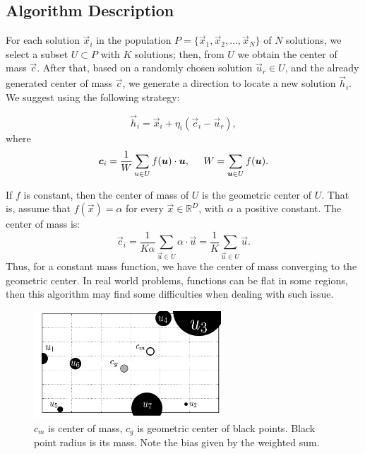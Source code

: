 \documentclass{svproc}
\begin{document}
\subsection{Algorithm Description} %
\label{sub:algorithm_description}

For each solution $\vec{x}_i $ in the population $P = \{ \vec{x}_1, \vec{x}_2, \ldots, \vec{x}_{N} \} $ of $N$ 
solutions, we select a subset $U \subset P $ with $K$ solutions; then, 
from $U$ we obtain the center of mass $\vec{c}$. After that, based on 
a randomly chosen solution $\vec{u}_r \in U$,  
and the already generated center of mass $\vec{c}$, we generate a direction 
to locate a new solution $ \vec{h}_i$. We suggest using the following strategy:

\begin{equation}
	\vec{h}_i = \vec{x}_i + \eta _{i} ( \vec{c}_i - \vec{u}_{r} ),
	\label{eqn:vcu}
\end{equation}
%
where 
%
\begin{equation}
	\vec{c}_i = \dfrac{1} {W} \sum_{u \in U} f(\vec{u}) \cdot \vec{u} , 
			\hspace{0.5cm} 
			W = \sum_{ \vec{u} \in U} f(\vec{u}).
	\label{eqn:center}
\end{equation}

\begin{note}
	If $f$ is constant, then the center of mass of $U$ is the geometric 
	center of  $U$. That is, assume that $f(\vec{x}) = \alpha$ for every 
	$\vec{x} \in \mathbb{R}^D$,  with $\alpha$ a positive constant. The 
	center of mass is:
%
\begin{equation}
	\vec{c}_i = \dfrac{1} {K \alpha} \sum_{ \vec{u} \in U} \alpha \cdot \vec{u} =  \dfrac{1} {K } \sum_{\vec{u} \in U} \vec{u}.
	\label{eqn:center-geometric}
\end{equation}
%
Thus, for a constant mass function, we have the center of mass converging 
to the geometric center. In real world problems, functions can be flat 
in some regions, then this algorithm may find some difficulties  when 
dealing with such issue.
\end{note}

\begin{figure}%
	\centering
	\includegraphics[width=7cm]{img/masses.pdf}
	\caption{$c_m$ is center of mass, $c_g$ is geometric center of black points. %
	Black point radius is its mass. Note the bias given by the weighted sum.}
	\label{fig:masses}       %
\end{figure}
\end{document}
